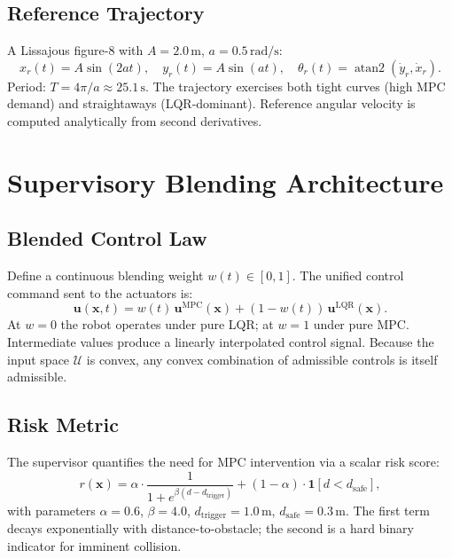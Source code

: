 \documentclass[12pt,a4paper,oneside]{report}
\begin{document}
\section{Reference Trajectory}

A Lissajous figure-8 with \(A=2.0\,\text{m}\), \(a=0.5\,\text{rad/s}\):
\begin{equation}
  x_r(t)=A\sin(2at),\quad y_r(t)=A\sin(at),\quad
  \theta_r(t)=\operatorname{atan2}(\dot{y}_r,\dot{x}_r).
\end{equation}
Period: \(T=4\pi/a\approx25.1\,\text{s}\). The trajectory exercises both
tight curves (high MPC demand) and straightaways (LQR-dominant). Reference
angular velocity is computed analytically from second derivatives.

\chapter{Supervisory Blending Architecture}\label{ch:blending}

\section{Blended Control Law}

Define a continuous blending weight \(w(t)\in[0,1]\). The unified control
command sent to the actuators is:
\begin{equation}\label{eq:blend}
  \mathbf{u}(\mathbf{x},t) =
    w(t)\,\mathbf{u}^{\mathrm{MPC}}(\mathbf{x}) +
    (1-w(t))\,\mathbf{u}^{\mathrm{LQR}}(\mathbf{x}).
\end{equation}
At \(w=0\) the robot operates under pure LQR; at \(w=1\) under pure MPC.
Intermediate values produce a linearly interpolated control signal.
Because the input space \(\mathcal{U}\) is convex, any convex combination
of admissible controls is itself admissible.

\section{Risk Metric}\label{sec:risk}

The supervisor quantifies the need for MPC intervention via a scalar risk
score:
\begin{equation}\label{eq:risk}
  r(\mathbf{x}) =
    \alpha\cdot\frac{1}{1+e^{\beta(d-d_{\mathrm{trigger}})}} +
    (1-\alpha)\cdot\mathbf{1}[d < d_{\mathrm{safe}}],
\end{equation}
with parameters \(\alpha=0.6\), \(\beta=4.0\),
\(d_{\mathrm{trigger}}=1.0\,\text{m}\), \(d_{\mathrm{safe}}=0.3\,\text{m}\).
The first term decays exponentially with distance-to-obstacle; the second
is a hard binary indicator for imminent collision.
\end{document}
